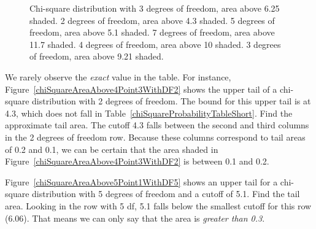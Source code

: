 \begin{figure}
{\label{chiSquareAreaAbove10WithDF4}
}
\caption{\textbf{} Chi-square distribution with 3 degrees of freedom, area above 6.25 shaded. \textbf{} 2 degrees of freedom, area above 4.3 shaded. \textbf{} 5 degrees of freedom, area above 5.1 shaded. \textbf{} 7 degrees of freedom, area above 11.7 shaded. \textbf{} 4 degrees of freedom, area above 10 shaded. \textbf{} 3 degrees of freedom, area above 9.21 shaded.}
\label{arrayOfFigureAreasForChiSquareDistribution}
\end{figure}

\begin{example}{We rarely observe the \emph{exact} value in the table. For instance, Figure~\ref{chiSquareAreaAbove4Point3WithDF2} shows the upper tail of a chi-square distribution with 2 degrees of freedom. The bound for this upper tail is at 4.3, which does not fall in Table~\ref{chiSquareProbabilityTableShort}. Find the approximate tail area.}
The cutoff 4.3 falls between the second and third columns in the 2 degrees of freedom row. Because these columns correspond to tail areas of 0.2 and 0.1, we can be certain that the area shaded in Figure~\ref{chiSquareAreaAbove4Point3WithDF2} is between 0.1 and 0.2.
\end{example}

\begin{example}{Figure~\ref{chiSquareAreaAbove5Point1WithDF5} shows an upper tail for a chi-square distribution with 5 degrees of freedom and a cutoff of 5.1. Find the tail area.}
Looking in the row with 5 df, 5.1 falls below the smallest cutoff for this row (6.06). That means we can only say that the area is \emph{greater than 0.3}.
\end{example}

